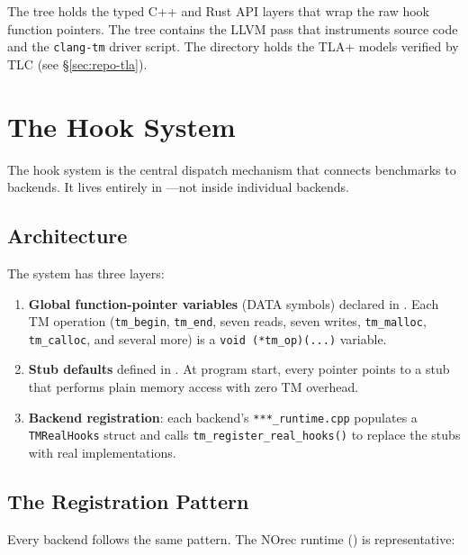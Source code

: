 The  tree holds the typed C++ and Rust API layers
that wrap the raw hook function pointers.  The  tree
contains the LLVM pass that instruments source code and the
\texttt{clang-tm} driver script.  The  directory
holds the TLA+ models verified by TLC (see \S\ref{sec:repo-tla}).

\section{The Hook System}
\label{sec:repo-hooks}

The hook system is the central dispatch mechanism that connects
benchmarks to backends.  It lives entirely in
---not inside individual backends.

\subsection{Architecture}

The system has three layers:

\begin{enumerate}
    \item \textbf{Global function-pointer variables} (DATA symbols)
          declared in .  Each
          TM operation (\texttt{tm\_begin}, \texttt{tm\_end}, seven reads,
          seven writes, \texttt{tm\_malloc}, \texttt{tm\_calloc}, and
          several more) is a \texttt{void (*tm\_op)(...)} variable.
    \item \textbf{Stub defaults} defined in
          .  At program start,
          every pointer points to a stub that performs plain memory access
          with zero TM overhead.
    \item \textbf{Backend registration}: each backend's
          \texttt{***\_runtime.cpp} populates a \texttt{TMRealHooks}
          struct and calls \texttt{tm\_register\_real\_hooks()} to replace
          the stubs with real implementations.
\end{enumerate}

\subsection{The Registration Pattern}

Every backend follows the same pattern.  The NOrec runtime
() is representative:

